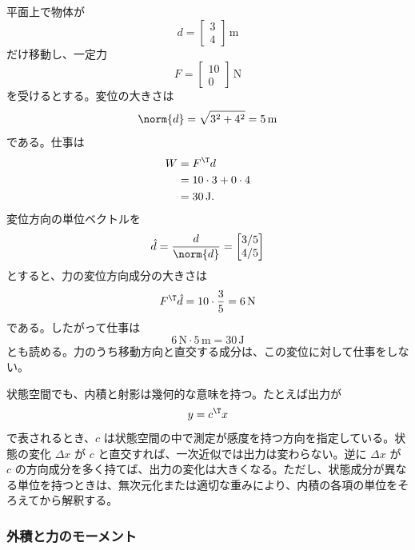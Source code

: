 \begin{example}[力、仕事、射影]
平面上で物体が
\begin{equation}
  d=\begin{bmatrix}3\\4\end{bmatrix}\,\mathrm{m}
\end{equation}
だけ移動し、一定力
\begin{equation}
  F=\begin{bmatrix}10\\0\end{bmatrix}\,\mathrm{N}
\end{equation}
を受けるとする。変位の大きさは
\begin{equation}
  \norm{d}=\sqrt{3^2+4^2}=5\,\mathrm{m}
\end{equation}
である。仕事は
\begin{align}
  W
  &=F^\T d\\
  &=10\cdot3+0\cdot4\\
  &=30\,\mathrm{J}.
\end{align}
変位方向の単位ベクトルを
\begin{equation}
  \hat{d}=\frac{d}{\norm{d}}
  =
  \begin{bmatrix}3/5\\4/5\end{bmatrix}
\end{equation}
とすると、力の変位方向成分の大きさは
\begin{equation}
  F^\T \hat{d}=10\cdot\frac{3}{5}=6\,\mathrm{N}
\end{equation}
である。したがって仕事は
\begin{equation}
  6\,\mathrm{N}\cdot5\,\mathrm{m}=30\,\mathrm{J}
\end{equation}
とも読める。力のうち移動方向と直交する成分は、この変位に対して仕事をしない。
\end{example}

状態空間でも、内積と射影は幾何的な意味を持つ。たとえば出力が
\begin{equation}
  y=c^\T x
\end{equation}
で表されるとき、$c$ は状態空間の中で測定が感度を持つ方向を指定している。状態の変化 $\Delta x$ が $c$ と直交すれば、一次近似では出力は変わらない。逆に $\Delta x$ が $c$ の方向成分を多く持てば、出力の変化は大きくなる。ただし、状態成分が異なる単位を持つときは、無次元化または適切な重みにより、内積の各項の単位をそろえてから解釈する。

\subsubsection{外積と力のモーメント}

